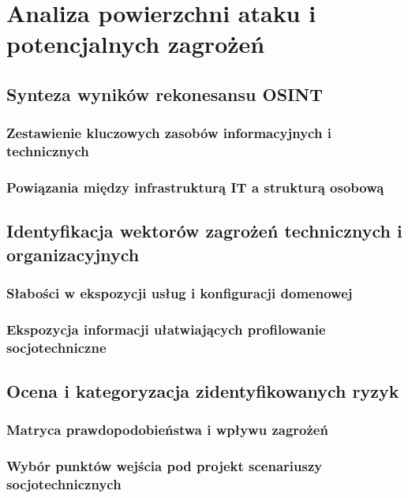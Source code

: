 \chapter{Analiza powierzchni ataku i potencjalnych zagrożeń}\label{ch:powierzchnia-ataku}

\section{Synteza wyników rekonesansu OSINT}\label{sec:synteza-osint}
\subsection{Zestawienie kluczowych zasobów informacyjnych i technicznych}\label{subsec:kluczowe-zasoby}
\subsection{Powiązania między infrastrukturą IT a strukturą osobową}\label{subsec:korelacja-zasobow}

\section{Identyfikacja wektorów zagrożeń technicznych i organizacyjnych}\label{sec:wektory-zagrozen}
\subsection{Słabości w ekspozycji usług i konfiguracji domenowej}\label{subsec:slabosci-techniczne}
\subsection{Ekspozycja informacji ułatwiających profilowanie socjotechniczne}\label{subsec:podatnosci-socjotechniczne}

\section{Ocena i kategoryzacja zidentyfikowanych ryzyk}\label{sec:ocena-ryzyka}
\subsection{Matryca prawdopodobieństwa i wpływu zagrożeń}\label{subsec:matryca-ryzyka}
\subsection{Wybór punktów wejścia pod projekt scenariuszy socjotechnicznych}\label{subsec:punkty-wejscia}

